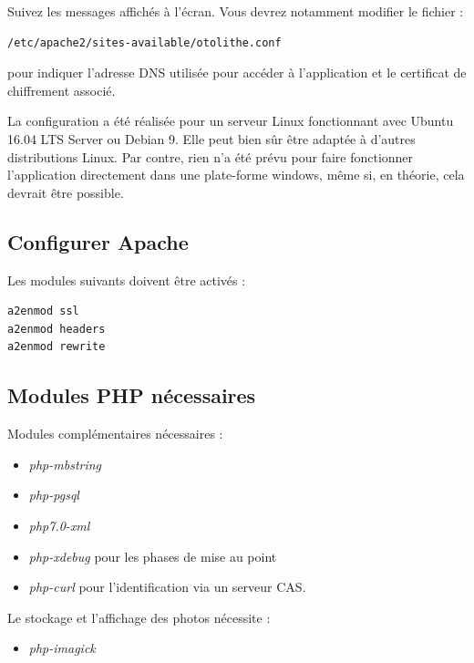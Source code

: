 Suivez les messages affichés à l'écran. Vous devrez notamment modifier le fichier :
\begin{lstlisting}
/etc/apache2/sites-available/otolithe.conf 
\end{lstlisting}
pour indiquer l'adresse DNS utilisée pour accéder à l'application et le certificat de chiffrement associé.

La configuration a été réalisée pour un serveur Linux fonctionnant avec Ubuntu 16.04 LTS Server ou Debian 9. Elle peut bien sûr être adaptée à d'autres distributions Linux. Par contre, rien n'a été prévu pour faire fonctionner l'application directement dans une plate-forme windows, même si, en théorie, cela devrait être possible.

\subsection{Configurer Apache}
Les modules suivants doivent être activés :
\begin{lstlisting}
a2enmod ssl
a2enmod headers
a2enmod rewrite
\end{lstlisting}
\subsection{Modules PHP nécessaires}
Modules complémentaires nécessaires :
\begin{itemize}
\item \textit{php-mbstring}
\item \textit{php-pgsql}
\item \textit{php7.0-xml} 
\item \textit{php-xdebug} pour les phases de mise au point
\item \textit{php-curl} pour l'identification via un serveur CAS.
\end{itemize}

Le stockage et l'affichage des photos nécessite :
\begin{itemize}
\item \textit{php-imagick}
\end{itemize}


